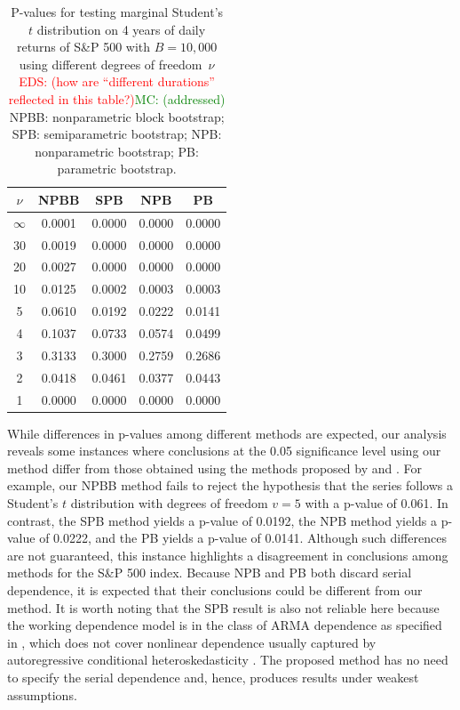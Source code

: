 \documentclass[APA,Times1COL]{WileyNJDv5} %
\newcommand{\eds}[1]{\textcolor{red}{EDS: (#1)}}
\newcommand{\mc}[1]{\textcolor{green}{MC: (#1)}}
\begin{document}
\begin{table}[ht]
\centering
\caption{P-values for testing marginal Student's $t$ distribution on  
  4 years of daily returns of S\&P 500 with $B = 10,000$
  using different degrees of freedom~$\nu$ 
	\eds{how are ``different durations'' reflected in this table?}\mc{addressed}
  NPBB: nonparametric block bootstrap;
  SPB: semiparametric bootstrap;
  NPB: nonparametric bootstrap;
  PB: parametric bootstrap.} 
\label{table:SP5004}
\begin{tabular}{ccccc}
  \toprule
$\nu$ & NPBB & SPB & NPB & PB\\ 
  \midrule
$\infty$ & 0.0001 & 0.0000 & 0.0000 & 0.0000 \\ 
  30 & 0.0019 & 0.0000 & 0.0000 & 0.0000 \\ 
  20 & 0.0027 & 0.0000 & 0.0000 & 0.0000 \\ 
  10 & 0.0125 & 0.0002 & 0.0003 & 0.0003 \\ 
  5 & 0.0610 & 0.0192 & 0.0222 & 0.0141 \\ 
  4 & 0.1037 & 0.0733 & 0.0574 & 0.0499 \\ 
  3 & 0.3133 & 0.3000 & 0.2759 & 0.2686 \\ 
  2 & 0.0418 & 0.0461 & 0.0377 & 0.0443 \\ 
  1 & 0.0000 & 0.0000 & 0.0000 & 0.0000 \\ 
  \bottomrule
\end{tabular}
\end{table}

While differences in p-values among different methods are expected, our analysis
reveals some instances where conclusions at the 0.05 significance level
using our method differ from those obtained using the methods proposed by
\citet{babu2004goodness} and \citet{zeimbekakis2022misuses}.
For example, our NPBB method fails to reject the
hypothesis that the series follows a Student's $t$ distribution with degrees of
freedom $v = 5$ with a p-value of 0.061. In contrast, 
the SPB method yields a p-value of 0.0192,
the NPB method yields a p-value of 0.0222, and the PB yields a p-value of
0.0141. Although such differences are not guaranteed, this
instance highlights a disagreement in conclusions among methods for the S\&P 500
index. Because NPB and PB both discard serial dependence, it is expected that
their conclusions could be different from our method. It is worth noting that
the SPB result is also not reliable here because the working dependence model is
in the class of ARMA dependence as specified in \citet{zeimbekakis2022misuses},
which does not cover nonlinear dependence usually captured by autoregressive
conditional heteroskedasticity \citep{engle1995arch}. The proposed method has
no need to specify the serial dependence and, hence, produces results under
weakest assumptions.
\end{document}
